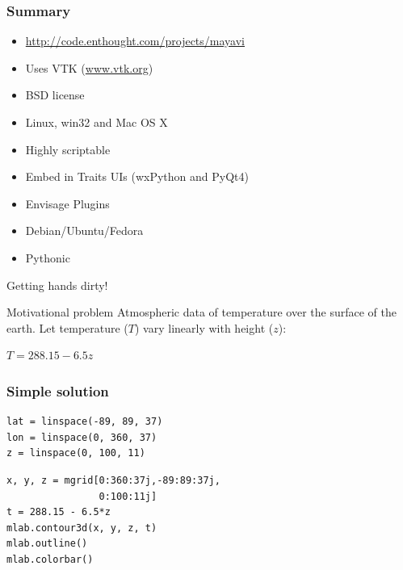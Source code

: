 \documentclass[compress,14pt]{beamer}
\newcounter{time}
\newcommand{\inctime}[1]{\addtocounter{time}{#1}{\vspace*{0.1in}\tiny \thetime\ m}}
\begin{document}
\begin{frame}
  \frametitle{Summary}
      \begin{itemize}
          \item \url{http://code.enthought.com/projects/mayavi}
          \item Uses VTK (\url{www.vtk.org})
          \item BSD license
          \item Linux, win32 and Mac OS X
          \item Highly scriptable
          \item Embed in Traits UIs (wxPython and PyQt4)
          \item Envisage Plugins
          \item Debian/Ubuntu/Fedora
          \item \alert{Pythonic}
      \end{itemize}
    
      \inctime{10}

\end{frame}

\begin{frame}
    {Getting hands dirty!}

        \begin{block}{Motivational problem}
        Atmospheric data of temperature over the surface of the earth.
        Let temperature ($T$) vary linearly with height ($z$):
        \begin{center}            
        $T = 288.15 - 6.5z$
        \end{center}
        \end{block}
\end{frame}

\begin{frame}[fragile]
    \frametitle{Simple solution}

    \begin{lstlisting}
lat = linspace(-89, 89, 37)
lon = linspace(0, 360, 37)
z = linspace(0, 100, 11)
    \end{lstlisting}
\pause
    \begin{lstlisting}
x, y, z = mgrid[0:360:37j,-89:89:37j,
                0:100:11j]
t = 288.15 - 6.5*z
mlab.contour3d(x, y, z, t)
mlab.outline()
mlab.colorbar()
    \end{lstlisting}
\end{frame}
\end{document}
